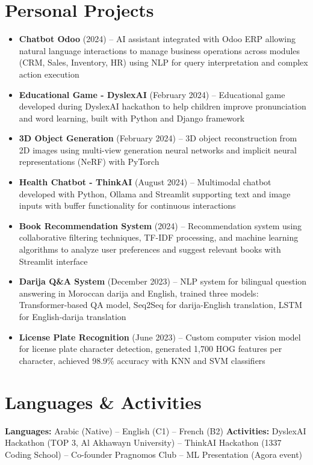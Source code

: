 \documentclass[10pt,a4paper]{article}
\begin{document}
\section*{Personal Projects}
\begin{itemize}
    \item \textbf{Chatbot Odoo} (2024) -- AI assistant integrated with Odoo ERP allowing natural language interactions to manage business operations across modules (CRM, Sales, Inventory, HR) using NLP for query interpretation and complex action execution
    \item \textbf{Educational Game - DyslexAI} (February 2024) -- Educational game developed during DyslexAI hackathon to help children improve pronunciation and word learning, built with Python and Django framework
    \item \textbf{3D Object Generation} (February 2024) -- 3D object reconstruction from 2D images using multi-view generation neural networks and implicit neural representations (NeRF) with PyTorch
    \item \textbf{Health Chatbot - ThinkAI} (August 2024) -- Multimodal chatbot developed with Python, Ollama and Streamlit supporting text and image inputs with buffer functionality for continuous interactions
    \item \textbf{Book Recommendation System} (2024) -- Recommendation system using collaborative filtering techniques, TF-IDF processing, and machine learning algorithms to analyze user preferences and suggest relevant books with Streamlit interface
    \item \textbf{Darija Q\&A System} (December 2023) -- NLP system for bilingual question answering in Moroccan darija and English, trained three models: Transformer-based QA model, Seq2Seq for darija-English translation, LSTM for English-darija translation
    \item \textbf{License Plate Recognition} (June 2023) -- Custom computer vision model for license plate character detection, generated 1,700 HOG features per character, achieved 98.9\% accuracy with KNN and SVM classifiers
\end{itemize}

\section*{Languages \& Activities}
\textbf{Languages:} Arabic (Native) -- English (C1) -- French (B2) \quad
\textbf{Activities:} DyslexAI Hackathon (TOP 3, Al Akhawayn University) -- ThinkAI Hackathon (1337 Coding School) -- Co-founder Pragnomos Club -- ML Presentation (Agora event)
\end{document}
